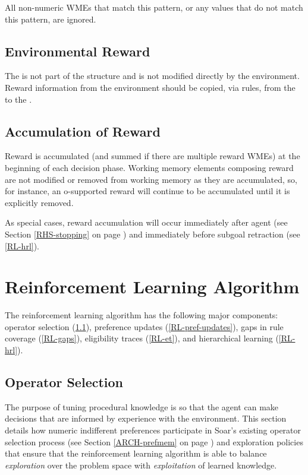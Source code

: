 All non-numeric WMEs that match this pattern, or any values that do not match this pattern, are ignored.

\subsection{Environmental Reward}
The  is not part of the  structure and is not modified directly by the environment.
Reward information from the environment should be copied, via rules, from the  to the .

\subsection{Accumulation of Reward}
Reward is accumulated (and summed if there are multiple reward WMEs) at the beginning of each decision phase.
Working memory elements composing reward are not modified or removed from working memory as they are accumulated, so, for instance, an o-supported reward will continue to be accumulated until it is explicitly removed.

As special cases, reward accumulation will occur immediately after agent  (see Section \ref{RHS-stopping} on page \pageref{RHS-stopping}) and immediately before subgoal retraction (see \ref{RL-hrl}).

\section{Reinforcement Learning Algorithm}
\label{RL-algo}

The reinforcement learning algorithm has the following major components: operator selection (\ref{RL-op-selection}), preference updates (\ref{RL-pref-updates}), gaps in rule coverage (\ref{RL-gaps}), eligibility traces (\ref{RL-et}), and hierarchical learning (\ref{RL-hrl}).

\subsection{Operator Selection}
\label{RL-op-selection}

The purpose of tuning procedural knowledge is so that the agent can make decisions that are informed by experience with the environment. This section details how numeric indifferent preferences participate in Soar's existing operator selection process (see Section \ref{ARCH-prefmem} on page \pageref{ARCH-prefmem}) and exploration policies that ensure that the reinforcement learning algorithm is able to balance \emph{exploration} over the problem space with \emph{exploitation} of learned knowledge.


